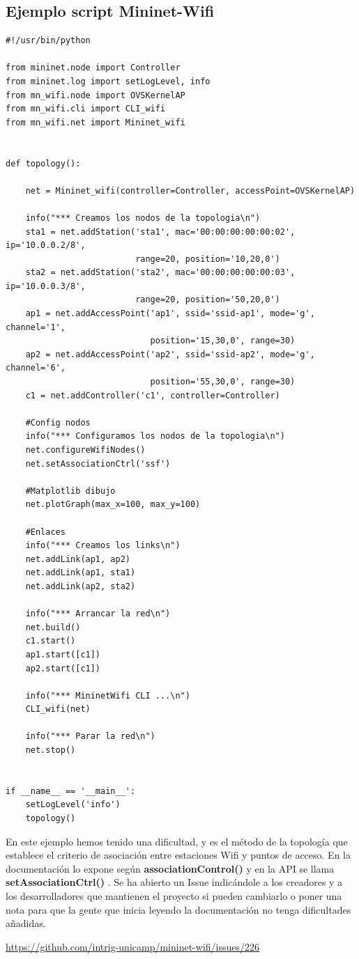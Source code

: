 \subsection{Ejemplo script Mininet-Wifi}
\begin{verbatim}
#!/usr/bin/python

from mininet.node import Controller
from mininet.log import setLogLevel, info
from mn_wifi.node import OVSKernelAP
from mn_wifi.cli import CLI_wifi
from mn_wifi.net import Mininet_wifi


def topology():
   
    net = Mininet_wifi(controller=Controller, accessPoint=OVSKernelAP)

    info("*** Creamos los nodos de la topologia\n")
    sta1 = net.addStation('sta1', mac='00:00:00:00:00:02', ip='10.0.0.2/8',
                          range=20, position='10,20,0')
    sta2 = net.addStation('sta2', mac='00:00:00:00:00:03', ip='10.0.0.3/8',
                          range=20, position='50,20,0')
    ap1 = net.addAccessPoint('ap1', ssid='ssid-ap1', mode='g', channel='1',
                             position='15,30,0', range=30)
    ap2 = net.addAccessPoint('ap2', ssid='ssid-ap2', mode='g', channel='6',
                             position='55,30,0', range=30)
    c1 = net.addController('c1', controller=Controller)

    #Config nodos   
    info("*** Configuramos los nodos de la topologia\n")
    net.configureWifiNodes()
    net.setAssociationCtrl('ssf')

    #Matplotlib dibujo 
    net.plotGraph(max_x=100, max_y=100)

    #Enlaces 
    info("*** Creamos los links\n")
    net.addLink(ap1, ap2)
    net.addLink(ap1, sta1)
    net.addLink(ap2, sta2)

    info("*** Arrancar la red\n")
    net.build()
    c1.start()
    ap1.start([c1])
    ap2.start([c1])

    info("*** MininetWifi CLI ...\n")
    CLI_wifi(net)

    info("*** Parar la red\n")
    net.stop()


if __name__ == '__main__':
    setLogLevel('info')
    topology()

\end{verbatim}
En este ejemplo hemos tenido una dificultad, y es el método de la topología que establece el criterio de asociación entre estaciones Wifi y puntos de acceso. En la documentación lo expone según \textbf{associationControl()} y en la API se llama \textbf{setAssociationCtrl()} . 
\newpage
Se ha abierto un Issue indicándole a los creadores y a los desarrolladores que mantienen el proyecto si pueden cambiarlo o poner una nota para que la gente que inicia leyendo la documentación no tenga dificultades añadidas. \newline
\newline
\begin{center}
\url{https://github.com/intrig-unicamp/mininet-wifi/issues/226}
\end{center}

